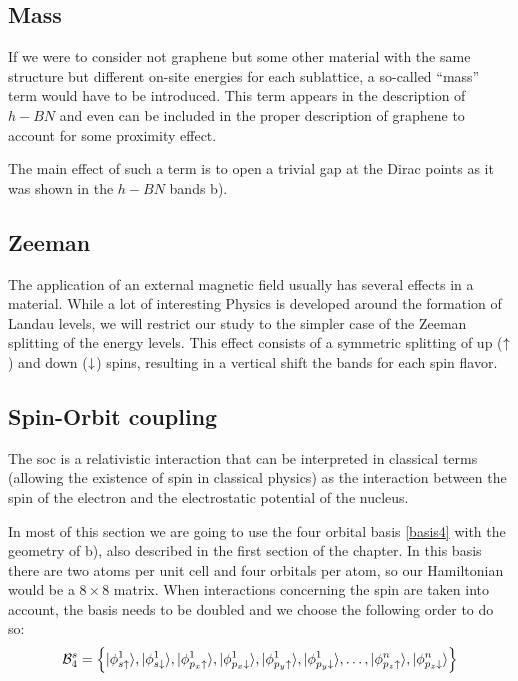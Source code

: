 \subsection{Mass}
If we were to consider not graphene but some other material with the same structure but different on-site energies for each sublattice, a so-called ``mass'' term would have to be introduced. This term appears in the description of $h-BN$ and even can be included in the proper description of graphene to account for some proximity effect.

The main effect of such a term is to open a trivial gap at the Dirac points as it was shown in the $h-BN$ bands b).

\subsection{Zeeman}
The application of an external magnetic field usually has several effects in a material. While a lot of interesting Physics is developed around the formation of Landau levels\cite{}, %
 we will restrict our study to the simpler case of the Zeeman splitting of the energy levels. This effect consists of a symmetric splitting of up ($\uparrow$) and down ($\downarrow$) spins, resulting in a vertical shift the bands for each spin flavor. %

\subsection{Spin-Orbit coupling}
\label{sec:soc}
The \acf{soc} is a relativistic interaction that can be interpreted in classical terms (allowing the existence of spin in classical physics) as the interaction between the spin of the electron and the electrostatic potential of the nucleus.

In most of this section we are going to use the four orbital basis \eqref{basis4} with the geometry of b), also described in the first section of the chapter.
In this basis there are two atoms per unit cell and four orbitals per atom, so our Hamiltonian would be a $8\times8$ matrix. When interactions concerning the spin are taken into account, the basis needs to be doubled and we choose the following order to do so:
\begin{equation}
  \mathcal{B}^{s}_4 = \left\{
  |\phi^1_{s\uparrow}\rangle,
  |\phi^1_{s\downarrow}\rangle,
  |\phi^1_{p_x\uparrow}\rangle,
  |\phi^1_{p_x\downarrow}\rangle,
  |\phi^1_{p_y\uparrow}\rangle,
  |\phi^1_{p_y\downarrow}\rangle,
  \dots,
  |\phi^n_{p_z\uparrow}\rangle,
  |\phi^n_{p_z\downarrow}\rangle
  \right\}
\label{basis4spin}
\end{equation}

